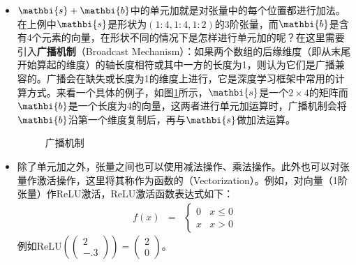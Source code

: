 \begin{itemize}
\vspace{0.5em}
\item $ {\mathbi{s}}+{\mathbi{b}} $中的单元加就是对张量中的每个位置都进行加法。在上例中$ {\mathbi{s}} $是形状为$ (1:4,1:4,1:2) $的3阶张量，而$ {\mathbi{b}}$是含有4个元素的向量，在形状不同的情况下是怎样进行单元加的呢？在这里需要引入{\small\sffamily\bfseries{广播机制}}（Broadcast Mechanism）：如果两个数组的后缘维度（即从末尾开始算起的维度）的轴长度相符或其中一方的长度为1，则认为它们是广播兼容的。广播会在缺失或长度为1的维度上进行，它是深度学习框架中常用的计算方式。来看一个具体的例子，如图\ref{fig:9-28}所示，$ {\mathbi{s}} $是一个$ 2\times 4 $的矩阵而$ {\mathbi{b}} $是一个长度为4的向量，这两者进行单元加运算时，广播机制会将$ {\mathbi{b}} $沿第一个维度复制后，再与$ {\mathbi{s}} $做加法运算。

\begin{figure}[htp]
\centering

\caption{广播机制}
\label{fig:9-28}
\end {figure}
\vspace{0.5em}
\item 除了单元加之外，张量之间也可以使用减法操作、乘法操作。此外也可以对张量作激活操作，这里将其称作为函数的{\small{}}（Vectorization）。例如，对向量（1阶张量）作ReLU激活，ReLU激活函数表达式如下：
\begin{eqnarray}
f(x)&=&\begin{cases} 0 & x\le 0 \\x & x>0\end{cases}
\label{eq:9-26}
\end{eqnarray}
\vspace{-0.5em}
例如$ {\textrm{ReLU}}\left( \begin{pmatrix} 2\\-.3\end{pmatrix}\right)=\begin{pmatrix} 2\\0\end{pmatrix} $。
\vspace{0.5em}
\end{itemize}


